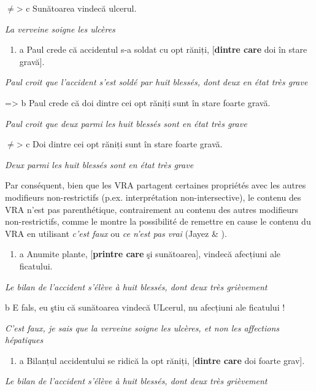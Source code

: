 ${\neq}${\textgreater}  c  Sunătoarea vindecă ulcerul.

{\itshape
La verveine soigne les ulcères}


\begin{enumerate}
\item \label{bkm:Ref294004599}a  Paul crede că accidentul s-a soldat cu opt răniți, [\textbf{dintre care} doi în stare gravă]. 


\end{enumerate}
{\itshape
Paul croit que l'accident s'est soldé par huit blessés, dont deux en état très grave}

={\textgreater}  b  Paul crede că doi dintre cei opt răniți sunt în stare foarte gravă.

{\itshape
Paul croit que deux parmi les huit blessés sont en état très grave}

${\neq}${\textgreater}  c  Doi dintre cei opt răniți sunt în stare foarte gravă.

{\itshape
Deux parmi les huit blessés sont en état très grave}

Par conséquent, bien que les VRA partagent certaines propriétés avec les autres modifieurs non-restrictifs (p.ex. interprétation non-intersective), le contenu des VRA n'est pas parenthétique, contrairement au contenu des autres modifieurs non-restrictifs, comme le montre la possibilité de remettre en cause le contenu du VRA en utilisant \textit{c'est faux} ou \textit{ce n'est pas vrai} (Jayez \& \citet{Rossari2004}). 


\begin{enumerate}
\item a  Anumite plante, [\textbf{printre care} şi sunătoarea], vindecă afecțiuni ale ficatului.  


\end{enumerate}
{\itshape
Le bilan de l'accident s'élève à huit blessés, dont deux très grièvement}

  b  E fals, eu ştiu că sunătoarea vindecă ULcerul, nu afecțiuni ale ficatului !

{\itshape
C'est faux, je sais que la verveine soigne les ulcères, et non les affections hépatiques } 


\begin{enumerate}
\item a  Bilanțul accidentului se ridică la opt răniți, [\textbf{dintre care} doi foarte grav].  


\end{enumerate}
{\itshape
Le bilan de l'accident s'élève à huit blessés, dont deux très grièvement}


